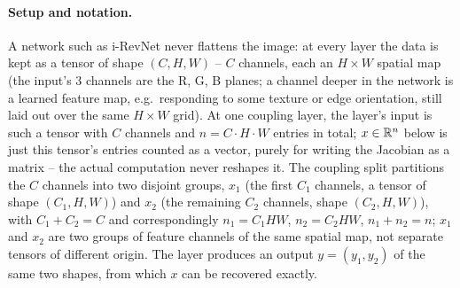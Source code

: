 \paragraph{Setup and notation.} A network such as i-RevNet never flattens the image: at every layer the
data is kept as a tensor of shape $(C,H,W)$ -- $C$ channels, each an $H\times W$ spatial map (the input's
3 channels are the R, G, B planes; a channel deeper in the network is a learned feature map, e.g.\
responding to some texture or edge orientation, still laid out over the same $H\times W$ grid). At one
coupling layer, the layer's input is such a tensor with $C$ channels and $n=C\cdot H\cdot W$ entries in
total; $x\in\mathbb{R}^n$ below is just this tensor's entries counted as a vector, purely for writing the Jacobian
as a matrix -- the actual computation never reshapes it. The coupling split partitions the $C$ channels
into two disjoint groups, $x_1$ (the first $C_1$ channels, a tensor of shape $(C_1,H,W)$) and $x_2$ (the
remaining $C_2$ channels, shape $(C_2,H,W)$), with $C_1+C_2=C$ and correspondingly $n_1=C_1HW$,
$n_2=C_2HW$, $n_1+n_2=n$; $x_1$ and $x_2$ are two groups of feature channels of the same spatial map, not
separate tensors of different origin. The layer produces an output $y=(y_1,y_2)$ of the same two shapes,
from which $x$ can be recovered exactly.

